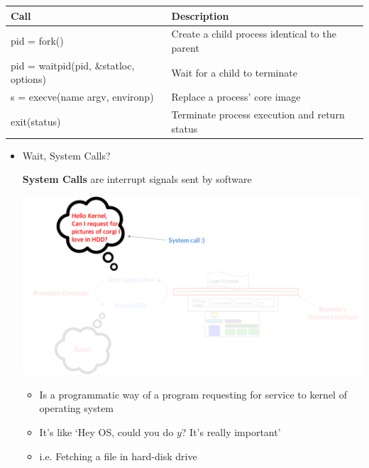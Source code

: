 \documentclass[12pt]{article}
\begin{document}
\begin{itemize}
\begin{itemize}
        \begin{tabular}{|l|l|}
            \hline
            \textbf{Call} & \textbf{Description}\\
            \hline
            pid = fork() & Create a child process identical to the parent\\
            \hline
            pid = waitpid(pid, \&statloc, options) & Wait for a child to terminate\\
            \hline
            s = execve(name argv, environp) & Replace a process' core image\\
            \hline
            exit(status) & Terminate process execution and return status\\
            \hline
        \end{tabular}
    \end{itemize}

    \bigskip

    \begin{mdframed}
        \begin{itemize}
            \item Wait, System Calls?

            \bigskip

            \textbf{System Calls} are interrupt signals sent by software

            \begin{center}
            \includegraphics[width=\linewidth]{images/week_2_notes_1_8.png}
            \end{center}

            \begin{itemize}
                \item Is a programmatic way of a program requesting for service to
                kernel of operating system
                \item It's like `Hey OS, could you do $y$? It's really important'
                \item i.e. Fetching a file in hard-disk drive
            \end{itemize}


\end{itemize}
\end{mdframed}
\end{itemize}
\end{document}
